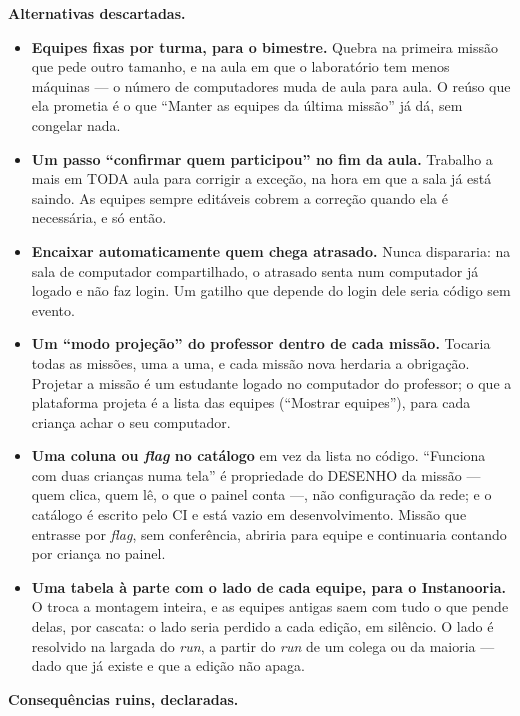 \textbf{Alternativas descartadas.}

\begin{itemize}
  \item \textbf{Equipes fixas por turma, para o bimestre.} Quebra na primeira
    missão que pede outro tamanho, e na aula em que o laboratório tem menos
    máquinas --- o número de computadores muda de aula para aula. O reúso que
    ela prometia é o que \enquote{Manter as equipes da última missão} já dá, sem
    congelar nada.
  \item \textbf{Um passo \enquote{confirmar quem participou} no fim da aula.}
    Trabalho a mais em TODA aula para corrigir a exceção, na hora em que a sala
    já está saindo. As equipes sempre editáveis cobrem a correção quando ela é
    necessária, e só então.
  \item \textbf{Encaixar automaticamente quem chega atrasado.} Nunca
    dispararia: na sala de computador compartilhado, o atrasado senta num
    computador já logado e não faz login. Um gatilho que depende do login dele
    seria código sem evento.
  \item \textbf{Um \enquote{modo projeção} do professor dentro de cada missão.}
    Tocaria todas as missões, uma a uma, e cada missão nova herdaria a
    obrigação. Projetar a missão é um estudante logado no computador do
    professor; o que a plataforma projeta é a lista das equipes
    (\enquote{Mostrar equipes}), para cada criança achar o seu computador.
  \item \textbf{Uma coluna ou \emph{flag} no catálogo} em vez da lista no
    código. \enquote{Funciona com duas crianças numa tela} é propriedade do
    DESENHO da missão --- quem clica, quem lê, o que o painel conta ---, não
    configuração da rede; e o catálogo  é escrito pelo CI e
    está vazio em desenvolvimento. Missão que entrasse por \emph{flag}, sem
    conferência, abriria para equipe e continuaria contando por criança no
    painel.
  \item \textbf{Uma tabela à parte com o lado de cada equipe, para o
    Instanooria.} O  troca a montagem inteira, e as equipes antigas
    saem com tudo o que pende delas, por cascata: o lado seria perdido a cada
    edição, em silêncio. O lado é resolvido na largada do \emph{run}, a partir
    do \emph{run} de um colega ou da maioria --- dado que já existe e que a
    edição não apaga.
\end{itemize}

\textbf{Consequências ruins, declaradas.}

